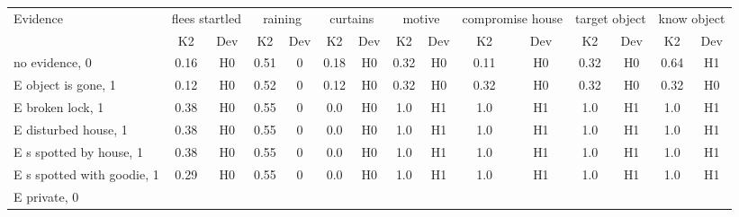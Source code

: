 \begin{table}\begin{tabular}{l|cc|cc|cc|cc|cc|cc|cc}\toprule\multirow{2}{*}{Evidence} & \multicolumn{2}{c}{flees startled}& \multicolumn{2}{c}{raining}& \multicolumn{2}{c}{curtains}& \multicolumn{2}{c}{motive}& \multicolumn{2}{c}{compromise house}& \multicolumn{2}{c}{target object}& \multicolumn{2}{c}{know object}\\& {K2} & {Dev}& {K2} & {Dev}& {K2} & {Dev}& {K2} & {Dev}& {K2} & {Dev}& {K2} & {Dev}& {K2} & {Dev}\\\midrule
no evidence, 0 & \cellcolor{Bittersweet}0.16&\cellcolor{Bittersweet}H0&\cellcolor{Bittersweet}0.51&\cellcolor{Bittersweet}0&\cellcolor{Bittersweet}0.18&\cellcolor{Bittersweet}H0&\cellcolor{Bittersweet}0.32&\cellcolor{Bittersweet}H0&\cellcolor{Bittersweet}0.11&\cellcolor{Bittersweet}H0&\cellcolor{Bittersweet}0.32&\cellcolor{Bittersweet}H0&\cellcolor{Bittersweet}0.64&\cellcolor{Bittersweet}H1\\E object is gone, 1 & \cellcolor{Bittersweet}0.12&\cellcolor{Bittersweet}H0&\cellcolor{Bittersweet}0.52&\cellcolor{Bittersweet}0&\cellcolor{Bittersweet}0.12&\cellcolor{Bittersweet}H0&\cellcolor{Bittersweet}0.32&\cellcolor{Bittersweet}H0&\cellcolor{Bittersweet}0.32&\cellcolor{Bittersweet}H0&\cellcolor{Bittersweet}0.32&\cellcolor{Bittersweet}H0&\cellcolor{Bittersweet}0.32&\cellcolor{Bittersweet}H0\\E broken lock, 1 & \cellcolor{Bittersweet}0.38&\cellcolor{Bittersweet}H0&\cellcolor{Bittersweet}0.55&\cellcolor{Bittersweet}0&\cellcolor{Bittersweet}0.0&\cellcolor{Bittersweet}H0&\cellcolor{Bittersweet}1.0&\cellcolor{Bittersweet}H1&\cellcolor{Bittersweet}1.0&\cellcolor{Bittersweet}H1&\cellcolor{Bittersweet}1.0&\cellcolor{Bittersweet}H1&\cellcolor{Bittersweet}1.0&\cellcolor{Bittersweet}H1\\E disturbed house, 1 & \cellcolor{Bittersweet}0.38&\cellcolor{Bittersweet}H0&\cellcolor{Bittersweet}0.55&\cellcolor{Bittersweet}0&\cellcolor{Bittersweet}0.0&\cellcolor{Bittersweet}H0&\cellcolor{Bittersweet}1.0&\cellcolor{Bittersweet}H1&\cellcolor{Bittersweet}1.0&\cellcolor{Bittersweet}H1&\cellcolor{Bittersweet}1.0&\cellcolor{Bittersweet}H1&\cellcolor{Bittersweet}1.0&\cellcolor{Bittersweet}H1\\E s spotted by house, 1 & \cellcolor{Bittersweet}0.38&\cellcolor{Bittersweet}H0&\cellcolor{Bittersweet}0.55&\cellcolor{Bittersweet}0&\cellcolor{Bittersweet}0.0&\cellcolor{Bittersweet}H0&\cellcolor{Bittersweet}1.0&\cellcolor{Bittersweet}H1&\cellcolor{Bittersweet}1.0&\cellcolor{Bittersweet}H1&\cellcolor{Bittersweet}1.0&\cellcolor{Bittersweet}H1&\cellcolor{Bittersweet}1.0&\cellcolor{Bittersweet}H1\\E s spotted with goodie, 1 & \cellcolor{Bittersweet}0.29&\cellcolor{Bittersweet}H0&\cellcolor{Bittersweet}0.55&\cellcolor{Bittersweet}0&\cellcolor{Bittersweet}0.0&\cellcolor{Bittersweet}H0&\cellcolor{Bittersweet}1.0&\cellcolor{Bittersweet}H1&\cellcolor{Bittersweet}1.0&\cellcolor{Bittersweet}H1&\cellcolor{Bittersweet}1.0&\cellcolor{Bittersweet}H1&\cellcolor{Bittersweet}1.0&\cellcolor{Bittersweet}H1\\E private, 0 & 
\end{tabular}
\end{table}
